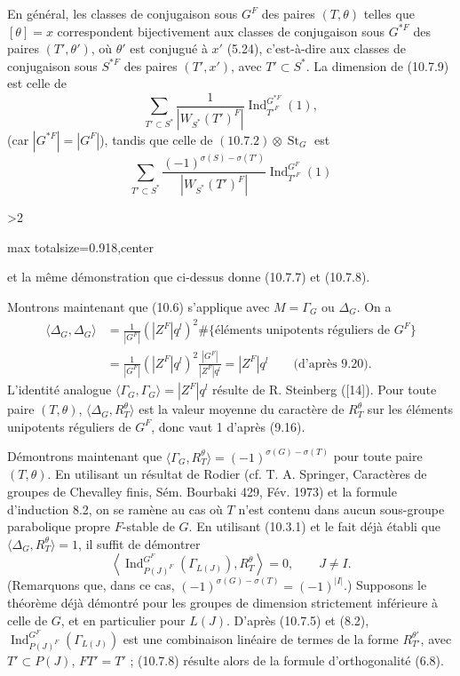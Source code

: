 \documentclass[9pt,twoside]{extarticle}
\newcommand{\EditionPage}[3]{%
  \ifnum#1>2\clearpage\fi
  \pdfbookmark[1]{Printed page #2}{fr-folio-#2}%
  \hypertarget{fr-physical-#1}{}%
  \noindent\begin{adjustbox}{max totalsize={\textwidth}{0.918\textheight},center}
  \begin{minipage}[t]{\textwidth}
  \fontsize{9.4}{11.1}\selectfont\justifying
  #3
  \end{minipage}
  \end{adjustbox}%
}
\begin{document}
{En général, les classes de conjugaison sous \(G^F\) des paires \((T,\theta)\) telles que \([\theta]=x\) correspondent bijectivement aux classes de conjugaison sous \(G^{*F}\) des paires \((T',\theta')\), où \(\theta'\) est conjugué à \(x'\) (5.24), c'est-à-dire aux classes de conjugaison sous \(S^{*F}\) des paires \((T',x')\), avec \(T'\subset S^*\). La dimension de (10.7.9) est celle de \[
\sum_{T'\subset S^*}
\frac1{|W_{S^*}(T')^F|}
\operatorname{Ind}_{T'^F}^{G^{*F}}(1),
\] (car \(|G^{*F}|=|G^F|\)), tandis que celle de \((10.7.2)\otimes\operatorname{St}_G\) est \[
\sum_{T'\subset S^*}
\frac{(-1)^{\sigma(S)-\sigma(T')}}{|W_{S^*}(T')^F|}
\operatorname{Ind}_{T'^F}^{G^F}(1)
\]\par
}

\EditionPage{58}{159}{%
et la même démonstration que ci-dessus donne (10.7.7) et (10.7.8).\par

Montrons maintenant que (10.6) s'applique avec \(M=\Gamma_G\) ou \(\Delta_G\). On a \[
\begin{aligned}
\langle\Delta_G,\Delta_G\rangle
&=\frac1{|G^F|}(|Z^F|q^l)^2\#\{\text{éléments unipotents réguliers de }G^F\}\\
&=\frac1{|G^F|}(|Z^F|q^l)^2\frac{|G^F|}{|Z^F|q^l}
=|Z^F|q^l\qquad\text{(d'après 9.20)}.
\end{aligned}
\] L'identité analogue \(\langle\Gamma_G,\Gamma_G\rangle=|Z^F|q^l\) résulte de R. Steinberg ([14]). Pour toute paire \((T,\theta)\), \(\langle\Delta_G,R_T^\theta\rangle\) est la valeur moyenne du caractère de \(R_T^\theta\) sur les éléments unipotents réguliers de \(G^F\), donc vaut 1 d'après (9.16).\par

Démontrons maintenant que \(\langle\Gamma_G,R_T^\theta\rangle=(-1)^{\sigma(G)-\sigma(T)}\) pour toute paire \((T,\theta)\). En utilisant un résultat de Rodier (cf. T. A. Springer, Caractères de groupes de Chevalley finis, Sém. Bourbaki 429, Fév. 1973) et la formule d'induction 8.2, on se ramène au cas où \(T\) n'est contenu dans aucun sous-groupe parabolique propre \(F\)-stable de \(G\). En utilisant (10.3.1) et le fait déjà établi que \(\langle\Delta_G,R_T^\theta\rangle=1\), il suffit de démontrer \[
\tag{10.7.8}
\left\langle
\operatorname{Ind}_{P(J)^F}^{G^F}(\Gamma_{L(J)}),R_T^\theta
\right\rangle=0,
\qquad J\ne I.
\] (Remarquons que, dans ce cas, \((-1)^{\sigma(G)-\sigma(T)}=(-1)^{|I|}\).) Supposons le théorème déjà démontré pour les groupes de dimension strictement inférieure à celle de \(G\), et en particulier pour \(L(J)\). D'après (10.7.5) et (8.2), \(\operatorname{Ind}_{P(J)^F}^{G^F}(\Gamma_{L(J)})\) est une combinaison linéaire de termes de la forme \(R_{T'}^{\theta'}\), avec \(T'\subset P(J)\), \(FT'=T'\) ; (10.7.8) résulte alors de la formule d'orthogonalité (6.8).\par

}
\end{document}
